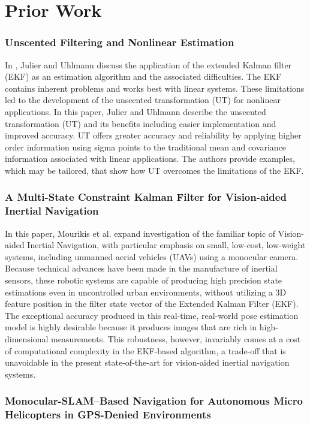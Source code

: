 \chapter{Prior Work}

\subsection{Unscented Filtering and Nonlinear Estimation}

In \cite{Julier1997,Julier2004}, Julier and Uhlmann discuss the application of the extended Kalman filter (EKF) as an estimation algorithm and the associated difficulties. The EKF contains inherent problems and works best with linear systems. These limitations led to the development of the unscented transformation (UT) for nonlinear applications. In this paper, Julier and Uhlmann describe the unscented transformation (UT) and its benefits including easier implementation and improved accuracy. UT offers greater accuracy and reliability by applying higher order information using sigma points to the traditional mean and covariance information associated with linear applications. The authors provide examples, which may be tailored, that show how UT overcomes the limitations of the EKF.

\subsection{A Multi-State Constraint Kalman Filter for Vision-aided Inertial Navigation}

In this paper, Mourikis et al. expand investigation of the familiar topic of Vision-aided Inertial Navigation, with particular emphasis on small, low-cost, low-weight systems, including unmanned aerial vehicles (UAVs) using a monocular camera. Because technical advances have been made in the manufacture of inertial sensors, these robotic systems are capable of producing high precision state estimations even in uncontrolled urban environments, without utilizing a 3D feature position in the filter state vector of the Extended Kalman Filter (EKF). The exceptional accuracy produced in this real-time, real-world pose estimation model is highly desirable because it produces images that are rich in high-dimensional measurements. This robustness, however, invariably comes at a cost of computational complexity in the EKF-based algorithm, a trade-off that is unavoidable in the present state-of-the-art for vision-aided inertial navigation systems.

\subsection{Monocular-SLAM–Based Navigation for Autonomous Micro Helicopters in GPS-Denied Environments}

